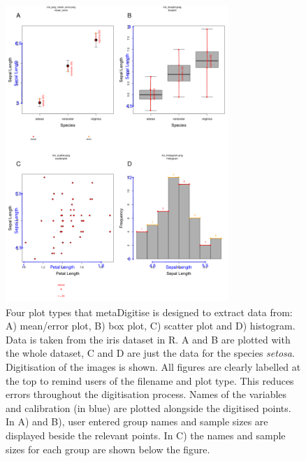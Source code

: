 \documentclass[12pt]{article}
\newcommand{\pkg}[1]{{\fontseries{b}\selectfont #1}}
\begin{document}
\begin{figure}[!h]
\centering 
 \includegraphics[width=0.75\textwidth]{fig_all_extract.pdf} 
 \caption{Four plot types that \pkg{metaDigitise} is designed to extract data from: A) mean/error plot, B) box plot, C) scatter plot and D) histogram. Data is taken from the iris dataset in R. A and B are plotted with the whole dataset, C and D are just the data for the species \textit{setosa}. Digitisation of the images is shown. All figures are clearly labelled at the top to remind users of the filename and plot type. This reduces errors throughout the digitisation process. Names of the variables and calibration (in blue) are plotted alongside the digitised points. In A) and B), user entered group names and sample sizes are displayed beside the relevant points. In C) the names and sample sizes for each group are shown below the figure.}
\label{fig:all_extract}
\end{figure}
\end{document}
